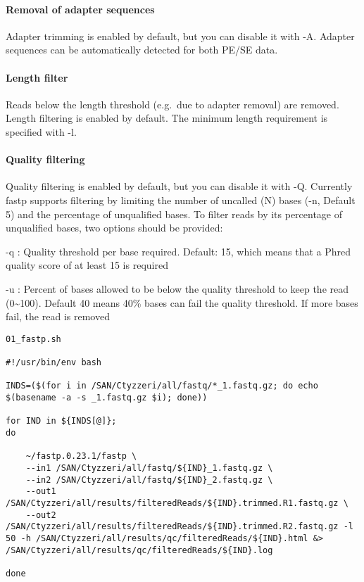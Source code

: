 \documentclass[
]{article}
\begin{document}
\hypertarget{removal-of-adapter-sequences}{%
\paragraph{Removal of adapter
sequences}\label{removal-of-adapter-sequences}}

Adapter trimming is enabled by default, but you can disable it with -A.
Adapter sequences can be automatically detected for both PE/SE data.

\hypertarget{length-filter}{%
\paragraph{Length filter}\label{length-filter}}

Reads below the length threshold (e.g.~due to adapter removal) are
removed. Length filtering is enabled by default. The minimum length
requirement is specified with -l.

\hypertarget{quality-filtering}{%
\paragraph{Quality filtering}\label{quality-filtering}}

Quality filtering is enabled by default, but you can disable it with -Q.
Currently fastp supports filtering by limiting the number of uncalled
(N) bases (-n, Default 5) and the percentage of unqualified bases. To
filter reads by its percentage of unqualified bases, two options should
be provided:

-q : Quality threshold per base required. Default: 15, which means that
a Phred quality score of at least 15 is required

-u : Percent of bases allowed to be below the quality threshold to keep
the read (0\textasciitilde100). Default 40 means 40\% bases can fail the
quality threshold. If more bases fail, the read is removed

\begin{verbatim}
01_fastp.sh

#!/usr/bin/env bash

INDS=($(for i in /SAN/Ctyzzeri/all/fastq/*_1.fastq.gz; do echo $(basename -a -s _1.fastq.gz $i); done))

for IND in ${INDS[@]};
do

    ~/fastp.0.23.1/fastp \
    --in1 /SAN/Ctyzzeri/all/fastq/${IND}_1.fastq.gz \
    --in2 /SAN/Ctyzzeri/all/fastq/${IND}_2.fastq.gz \
    --out1 /SAN/Ctyzzeri/all/results/filteredReads/${IND}.trimmed.R1.fastq.gz \
    --out2 /SAN/Ctyzzeri/all/results/filteredReads/${IND}.trimmed.R2.fastq.gz -l 50 -h /SAN/Ctyzzeri/all/results/qc/filteredReads/${IND}.html &> /SAN/Ctyzzeri/all/results/qc/filteredReads/${IND}.log

done
\end{verbatim}
\end{document}
